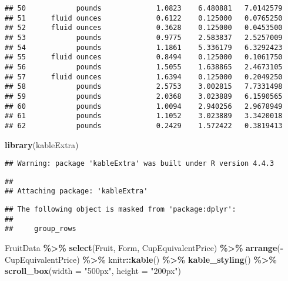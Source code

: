 \documentclass[
]{article}
\newenvironment{Shaded}{\begin{snugshade}}{\end{snugshade}}
\newcommand{\AttributeTok}[1]{\textcolor[rgb]{0.13,0.29,0.53}{#1}}
\newcommand{\FunctionTok}[1]{\textcolor[rgb]{0.13,0.29,0.53}{\textbf{#1}}}
\newcommand{\NormalTok}[1]{#1}
\newcommand{\SpecialCharTok}[1]{\textcolor[rgb]{0.81,0.36,0.00}{\textbf{#1}}}
\newcommand{\StringTok}[1]{\textcolor[rgb]{0.31,0.60,0.02}{#1}}
\begin{document}
\begin{verbatim}
## 50            pounds             1.0823    6.480881   7.0142579
## 51      fluid ounces             0.6122    0.125000   0.0765250
## 52      fluid ounces             0.3628    0.125000   0.0453500
## 53            pounds             0.9775    2.583837   2.5257009
## 54            pounds             1.1861    5.336179   6.3292423
## 55      fluid ounces             0.8494    0.125000   0.1061750
## 56            pounds             1.5055    1.638865   2.4673105
## 57      fluid ounces             1.6394    0.125000   0.2049250
## 58            pounds             2.5753    3.002815   7.7331498
## 59            pounds             2.0368    3.023889   6.1590565
## 60            pounds             1.0094    2.940256   2.9678949
## 61            pounds             1.1052    3.023889   3.3420018
## 62            pounds             0.2429    1.572422   0.3819413
\end{verbatim}

\begin{Shaded}
\begin{Highlighting}[]
\FunctionTok{library}\NormalTok{(kableExtra)}
\end{Highlighting}
\end{Shaded}

\begin{verbatim}
## Warning: package 'kableExtra' was built under R version 4.4.3
\end{verbatim}

\begin{verbatim}
## 
## Attaching package: 'kableExtra'
\end{verbatim}

\begin{verbatim}
## The following object is masked from 'package:dplyr':
## 
##     group_rows
\end{verbatim}

\begin{Shaded}
\begin{Highlighting}[]
\NormalTok{FruitData }\SpecialCharTok{\%\textgreater{}\%} \FunctionTok{select}\NormalTok{(Fruit, Form, CupEquivalentPrice) }\SpecialCharTok{\%\textgreater{}\%} \FunctionTok{arrange}\NormalTok{(}\SpecialCharTok{{-}}\NormalTok{CupEquivalentPrice) }\SpecialCharTok{\%\textgreater{}\%}\NormalTok{   knitr}\SpecialCharTok{::}\FunctionTok{kable}\NormalTok{() }\SpecialCharTok{\%\textgreater{}\%} \FunctionTok{kable\_styling}\NormalTok{() }\SpecialCharTok{\%\textgreater{}\%} \FunctionTok{scroll\_box}\NormalTok{(}\AttributeTok{width =} \StringTok{"500px"}\NormalTok{, }\AttributeTok{height =} \StringTok{"200px"}\NormalTok{)}
\end{Highlighting}
\end{Shaded}
\end{document}
